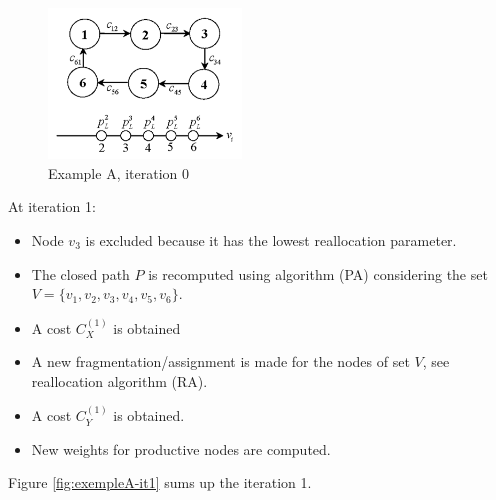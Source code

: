 \begin{figure}[h]
    \centering
    \includegraphics[height=4cm, keepaspectratio]{images/exempleA-it0}
    \caption{Example A, iteration 0}
    \label{fig:exempleA-it0}
\end{figure}
At iteration 1:
\begin{itemize}
    \item Node $v_3$ is excluded because it has the lowest reallocation parameter.
    \item The closed path $P$ is recomputed using algorithm (PA) considering the set $V = \{v_1,v_2,v_3,v_4, v_5, v_6\}$. 
    \item A cost $C^{(1)}_X$ is obtained
    \item A new fragmentation/assignment is made for the nodes of set $V$, see reallocation algorithm (RA).
    \item A cost $C^{(1)}_Y$ is obtained.
    \item New weights for productive nodes are computed.
\end{itemize}
Figure \ref{fig:exempleA-it1} sums up the iteration 1.

